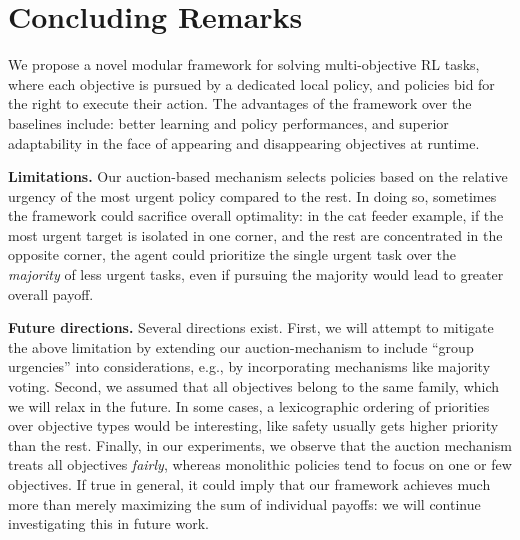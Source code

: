 

\section{Concluding Remarks}

We propose a novel modular framework for solving multi-objective RL tasks, where each objective is pursued by a dedicated local policy, and policies bid for the right to execute their action.
The advantages of the framework over the baselines include: better learning and policy performances, and superior adaptability in the face of appearing and disappearing objectives at runtime.

\textbf{Limitations.} 
Our auction-based mechanism selects policies based on the relative urgency of the most urgent policy compared to the rest.
In doing so, sometimes the framework could sacrifice overall optimality: 
in the cat feeder example, if the most urgent target is isolated in one corner, and the rest are concentrated in the opposite corner, the agent could prioritize the single urgent task over the \emph{majority} of less urgent tasks, even if pursuing the majority would lead to greater overall payoff.


\textbf{Future directions.}
Several directions exist.
First, we will attempt to mitigate the above limitation by extending our auction-mechanism to include ``group urgencies'' into considerations, e.g., by incorporating mechanisms like majority voting.
Second, we assumed that all objectives belong to the same family, which we will relax in the future.
In some cases, a lexicographic ordering of priorities over objective types would be interesting, like safety usually gets higher priority than the rest.
Finally, in our experiments, we observe that the auction mechanism treats all objectives \textit{fairly}, whereas monolithic policies tend to focus on one or few objectives.
If true in general, it could imply that our framework achieves much more than merely maximizing the sum of individual payoffs: we will continue investigating this in future work.
